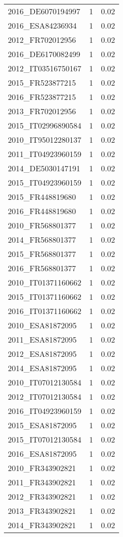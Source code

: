 \begin{table*}[htbp]
\begin{tabular}{lrr}
2016_DE6070194997 & 1 & 0.02 \\
2016_ESA84236934 & 1 & 0.02 \\
2012_FR702012956 & 1 & 0.02 \\
2016_DE6170082499 & 1 & 0.02 \\
2012_IT03516750167 & 1 & 0.02 \\
2015_FR523877215 & 1 & 0.02 \\
2016_FR523877215 & 1 & 0.02 \\
2013_FR702012956 & 1 & 0.02 \\
2015_IT02996890584 & 1 & 0.02 \\
2010_IT95012280137 & 1 & 0.02 \\
2011_IT04923960159 & 1 & 0.02 \\
2014_DE5030147191 & 1 & 0.02 \\
2015_IT04923960159 & 1 & 0.02 \\
2015_FR448819680 & 1 & 0.02 \\
2016_FR448819680 & 1 & 0.02 \\
2010_FR568801377 & 1 & 0.02 \\
2014_FR568801377 & 1 & 0.02 \\
2015_FR568801377 & 1 & 0.02 \\
2016_FR568801377 & 1 & 0.02 \\
2010_IT01371160662 & 1 & 0.02 \\
2015_IT01371160662 & 1 & 0.02 \\
2016_IT01371160662 & 1 & 0.02 \\
2010_ESA81872095 & 1 & 0.02 \\
2011_ESA81872095 & 1 & 0.02 \\
2012_ESA81872095 & 1 & 0.02 \\
2014_ESA81872095 & 1 & 0.02 \\
2010_IT07012130584 & 1 & 0.02 \\
2012_IT07012130584 & 1 & 0.02 \\
2016_IT04923960159 & 1 & 0.02 \\
2015_ESA81872095 & 1 & 0.02 \\
2015_IT07012130584 & 1 & 0.02 \\
2016_ESA81872095 & 1 & 0.02 \\
2010_FR343902821 & 1 & 0.02 \\
2011_FR343902821 & 1 & 0.02 \\
2012_FR343902821 & 1 & 0.02 \\
2013_FR343902821 & 1 & 0.02 \\
2014_FR343902821 & 1 & 0.02 \\

\end{tabular}
\end{table*}

